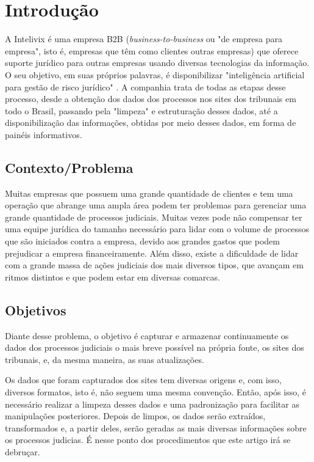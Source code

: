 \section{Introdução}
A Intelivix é uma empresa B2B (\textit{business-to-business} ou "de empresa para empresa", isto é, empresas que têm como clientes outras empresas) que oferece suporte jurídico para outras empresas usando diversas tecnologias da informação. O seu objetivo, em suas próprios palavras, é disponibilizar "inteligência artificial para gestão de risco jurídico" \cite{intelivix:2021}. A companhia trata de todas as etapas desse processo, desde a obtenção dos dados dos processos nos sites dos tribunais em todo o Brasil, passando pela "limpeza" e estruturação desses dados, até a disponibilização das informações, obtidas por meio desses dados, em forma de painéis informativos.

\subsection{Contexto/Problema}
Muitas empresas que possuem uma grande quantidade de clientes e tem uma operação que abrange uma ampla área podem ter problemas para gerenciar uma grande quantidade de processos judiciais. Muitas vezes pode não compensar ter uma equipe jurídica do tamanho necessário para lidar com o volume de processos que são iniciados contra a empresa, devido aos grandes gastos que podem prejudicar a empresa financeiramente. Além disso, existe a dificuldade de lidar com a grande massa de ações judiciais dos mais diversos tipos, que avançam em ritmos distintos e que podem estar em diversas comarcas.
 

\subsection{Objetivos}
Diante desse problema, o objetivo é capturar e armazenar continuamente os dados dos processos judiciais o mais breve possível na própria fonte, os sites dos tribunais, e, da mesma maneira, as suas atualizações.

Os dados que foram capturados dos sites tem diversas origens e, com isso, diversos formatos, isto é, não seguem uma mesma convenção. Então, após isso, é necessário realizar a limpeza desses dados e uma padronização para facilitar as manipulações posteriores. Depois de limpos, os dados serão extraídos, transformados e, a partir deles, serão geradas as mais diversas informações sobre os processos judicias. É nesse ponto dos procedimentos que este artigo irá se debruçar.

